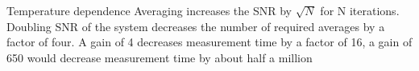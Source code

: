 \documentclass[final]{beamer}
\begin{document}
\begin{frame}[fragile]{}
\begin{columns}[T]
\begin{column}{.49\linewidth}
\begin{block}{\large Temperature dependence}
        Averaging increases the SNR by $\sqrt{N}$ for N iterations. Doubling SNR of the system decreases the number of required averages by a factor of four. A gain of 4 decreases measurement time by a factor of 16,
        a gain of 650 would decrease measurement time by about half a million
      \end{block}

    \end{column}



\end{columns}
\end{frame}
\end{document}
